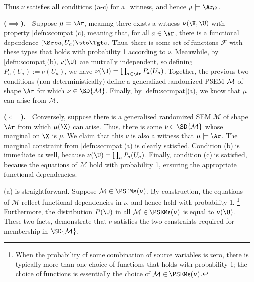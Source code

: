 \begin{subappendices}
\begin{lproof}
    
    Thus $\nu$ satisfies all conditions (a-c) for a \scibility\ witness, and hence $\mu \models \Ar_G$. 
\end{lproof}



\begin{lproof}\label{proof:gen-sim-compat-means-arise}
    \textbf{($\implies$).~} Suppose $\mu \models \Ar$, meaning there exists a witness
    $\nu(\X,\U)$ with property \cref{defn:scompat}(c), meaning
    that, for all $a \in \Ar$, 
    there is a functional dependence $(\Src a, U_a) \tto \Tgt a$.
    Thus, there is some set of functions $\mathcal F$ with these types that holds with probability 1 according to $\nu$. 
    Meanwhile, by \cref{defn:scompat}(b), $\nu(\U)$ are mutually independent, so defining $P_a(U_a) := \nu(U_a)$, we have $\nu(\U) = \prod_{a \in \Ar}P_a(U_a)$. 
    Together, the previous two conditions (non-deterministically) define a 
    generalized randomized PSEM
    $\cal M$ of shape $\Ar$ for which $\nu \in \SD{\mathcal M}$. 
    Finally, by \cref{defn:scompat}(a), we know that $\mu$ can arise from $\mathcal M$.
    
    \textbf{($\impliedby$).~} Conversely, suppose there is a generalized randomized SEM $\mathcal M$ of shape $\Ar$ from which $\mu(\X)$ can arise. 
    Thus, there is some $\nu \in \SD{\mathcal M}$ whose marginal on $\X$ is $\mu$. 
    We claim that this $\nu$ is also a witness that $\mu \models \Ar$.
    The marginal constraint from \cref{defn:scompat}(a) is clearly satisfied. 
    Condition (b) is immediate as well, because $\nu(\U) = \prod_{a} P_a(U_a)$. 
    Finally, condition (c) is satisfied, because the equations of $\mathcal M$ hold with probability 1, ensuring the appropriate functional dependencies. 
\end{lproof}

\begin{lproof}\label{proof:witness-model-properties}
    (a) is straightforward. 
    Suppose $\mathcal M \in \PSEMs(\nu)$. 
    By construction, the equations of $\mathcal M$ reflect functional dependencies in $\nu$, and hence hold with probability 1. 
    \unskip\footnote{When the probability of some combination of source variables is zero, there is typically more than one choice of functions that holds with probability 1; the choice of functions is essentially the choice of $\mathcal M \in \PSEMs(\nu)$.}
    Furthermore, the distribution $P(\U)$ in all $\mathcal M \in \PSEMs(\nu)$ is equal to $\nu(\U)$. 
    These two facts, demonstrate that $\nu$ satisfies the two constraints required for membership in $\SD{\mathcal M}$. 
    

\end{lproof}
\end{subappendices}
